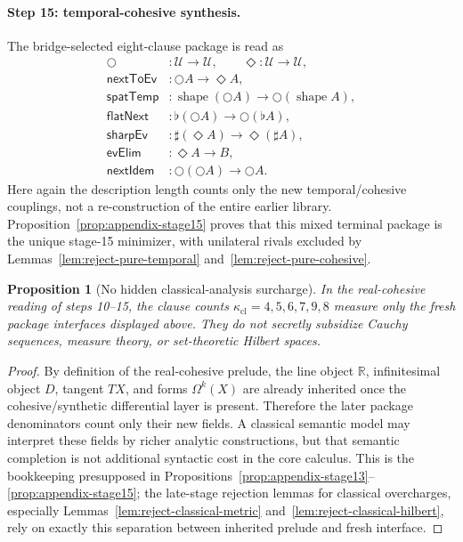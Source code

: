 \documentclass{lmcs}
\theoremstyle{plain}
\newtheorem{prop}[thm]{Proposition}
\theoremstyle{definition}
\theoremstyle{remark}
\newcommand{\R}{\ensuremath{\mathbb{R}}}
\newcommand{\U}{\ensuremath{\mathcal{U}}}
\newcommand{\shape}{\ensuremath{\operatorname{shape}}}
\newcommand{\sharpm}{\ensuremath{\mathbin{\sharp}}}
\newcommand{\nextm}{\ensuremath{\bigcirc}}
\newcommand{\ev}{\ensuremath{\Diamond}}
\begin{document}
\paragraph{Step 15: temporal-cohesive synthesis.}
The bridge-selected eight-clause package is read as
\[
\begin{aligned}
\nextm &: \U\to \U,\qquad \ev : \U\to \U,\\
\mathsf{nextToEv} &: \nextm A \to \ev A,\\
\mathsf{spatTemp} &: \shape(\nextm A)\to \nextm(\shape A),\\
\mathsf{flatNext} &: \flat(\nextm A)\to \nextm(\flat A),\\
\mathsf{sharpEv} &: \sharpm(\ev A)\to \ev(\sharpm A),\\
\mathsf{evElim} &: \ev A \to B,\\
\mathsf{nextIdem} &: \nextm(\nextm A)\to \nextm A.
\end{aligned}
\]
Here again the description length counts only the new temporal/cohesive couplings, not a re-construction of the entire earlier library. Proposition~\ref{prop:appendix-stage15} proves that this mixed terminal package is the unique stage-15 minimizer, with unilateral rivals excluded by Lemmas~\ref{lem:reject-pure-temporal} and~\ref{lem:reject-pure-cohesive}.

\begin{prop}[No hidden classical-analysis surcharge]
\label{prop:no-hidden-physics}
In the real-cohesive reading of steps 10--15, the clause counts $\kappa_{\mathrm{cl}}=4,5,6,7,9,8$ measure only the fresh package interfaces displayed above.
They do not secretly subsidize Cauchy sequences, measure theory, or set-theoretic Hilbert spaces.
\end{prop}

\begin{proof}
By definition of the real-cohesive prelude, the line object $\R$, infinitesimal object $D$, tangent $TX$, and forms $\Omega^k(X)$ are already inherited once the cohesive/synthetic differential layer is present.
Therefore the later package denominators count only their new fields.
A classical semantic model may interpret these fields by richer analytic constructions, but that semantic completion is not additional syntactic cost in the core calculus.
This is the bookkeeping presupposed in Propositions~\ref{prop:appendix-stage13}--\ref{prop:appendix-stage15}; the late-stage rejection lemmas for classical overcharges, especially Lemmas~\ref{lem:reject-classical-metric} and~\ref{lem:reject-classical-hilbert}, rely on exactly this separation between inherited prelude and fresh interface.
\end{proof}
\end{document}
